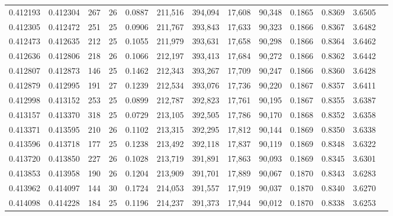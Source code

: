 \begin{tabular}{rrrrrrrrrrrrr}
0.412193 & 0.412304 & 267 &  26 &                                     0.0887 & 211,516 & 394,094 &  17,608 &  90,348 & 0.1865 & 0.8369 & 3.6505 \\
0.412305 & 0.412472 & 251 &  25 &                                     0.0906 & 211,767 & 393,843 &  17,633 &  90,323 & 0.1866 & 0.8367 & 3.6482 \\
0.412473 & 0.412635 & 212 &  25 &                                     0.1055 & 211,979 & 393,631 &  17,658 &  90,298 & 0.1866 & 0.8364 & 3.6462 \\
0.412636 & 0.412806 & 218 &  26 &                                     0.1066 & 212,197 & 393,413 &  17,684 &  90,272 & 0.1866 & 0.8362 & 3.6442 \\
0.412807 & 0.412873 & 146 &  25 &                                     0.1462 & 212,343 & 393,267 &  17,709 &  90,247 & 0.1866 & 0.8360 & 3.6428 \\
0.412879 & 0.412995 & 191 &  27 &                                     0.1239 & 212,534 & 393,076 &  17,736 &  90,220 & 0.1867 & 0.8357 & 3.6411 \\
0.412998 & 0.413152 & 253 &  25 &                                     0.0899 & 212,787 & 392,823 &  17,761 &  90,195 & 0.1867 & 0.8355 & 3.6387 \\
0.413157 & 0.413370 & 318 &  25 &                                     0.0729 & 213,105 & 392,505 &  17,786 &  90,170 & 0.1868 & 0.8352 & 3.6358 \\
0.413371 & 0.413595 & 210 &  26 &                                     0.1102 & 213,315 & 392,295 &  17,812 &  90,144 & 0.1869 & 0.8350 & 3.6338 \\
0.413596 & 0.413718 & 177 &  25 &                                     0.1238 & 213,492 & 392,118 &  17,837 &  90,119 & 0.1869 & 0.8348 & 3.6322 \\
0.413720 & 0.413850 & 227 &  26 &                                     0.1028 & 213,719 & 391,891 &  17,863 &  90,093 & 0.1869 & 0.8345 & 3.6301 \\
0.413853 & 0.413958 & 190 &  26 &                                     0.1204 & 213,909 & 391,701 &  17,889 &  90,067 & 0.1870 & 0.8343 & 3.6283 \\
0.413962 & 0.414097 & 144 &  30 &                                     0.1724 & 214,053 & 391,557 &  17,919 &  90,037 & 0.1870 & 0.8340 & 3.6270 \\
0.414098 & 0.414228 & 184 &  25 &                                     0.1196 & 214,237 & 391,373 &  17,944 &  90,012 & 0.1870 & 0.8338 & 3.6253 \\

\end{tabular}
